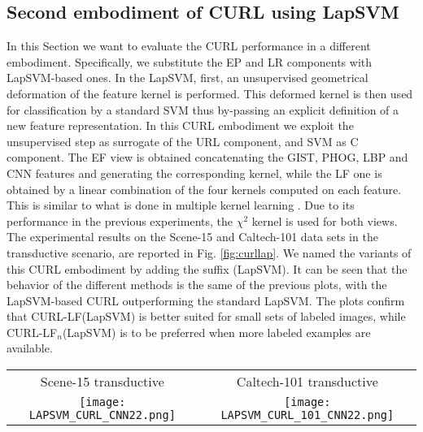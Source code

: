 \documentclass[journal,11pt]{IEEEtran}
\newcommand{\ADD}[1]{#1}
\newcommand{\emb}{embodiment}
\newcommand{\curllaplf}{CURL-LF(LapSVM)}
\newcommand{\curllaplfn}{CURL-LF$_n$(LapSVM)}
\begin{document}
\subsection{Second \emb{ }of CURL using LapSVM}
\label{subsec:curllap}
\ADD{
In this Section we want to evaluate the CURL performance in a different \emb. Specifically, we substitute the EP and LR components with LapSVM-based ones.
%
In the LapSVM, first, an unsupervised geometrical deformation of the feature kernel is performed. This deformed kernel is then used for classification by a standard SVM thus by-passing an explicit definition of a new feature representation. In this CURL \emb{ }we exploit the unsupervised step as surrogate of the URL component, and SVM as C component.
%
The EF view is obtained concatenating the GIST, PHOG, LBP and CNN features and generating the corresponding kernel, while the LF one is obtained by a linear combination of the four kernels computed on each feature. This is similar to what is done in multiple kernel learning \cite{gonen2011multiple}. Due to its performance in the previous experiments, the $\chi^2$ kernel is used for both views.
%
The experimental results on the Scene-15 and Caltech-101 data sets in the transductive scenario, are reported in Fig. \ref{fig:curllap}. We named the variants of this CURL \emb{ }by adding the suffix (LapSVM). It can be seen that the behavior of the different methods is the same of the previous plots, with the LapSVM-based CURL outperforming the standard LapSVM. The plots confirm that \curllaplf{ }is better suited for small sets of labeled images, while \curllaplfn{ }is to be preferred when more labeled examples are available.}


\begin{figure*}[!htbp]%
\centering
\begin{tabular}{cc}
\footnotesize{Scene-15 transductive} & \footnotesize{Caltech-101 transductive}\\
\texttt{[image: LAPSVM\_CURL\_CNN22.png]} &
\texttt{[image: LAPSVM\_CURL\_101\_CNN22.png]} \\
\end{tabular}
\caption{Mean Average Precision (MAP) varying the number of labeled images per class, obtained on the Scene-15 data set (left), and on the Caltech-101 data set (right). Results are obtained using GIST, PHOG, LBP and CNN features.}%
\label{fig:curllap}%
\end{figure*}
\end{document}
